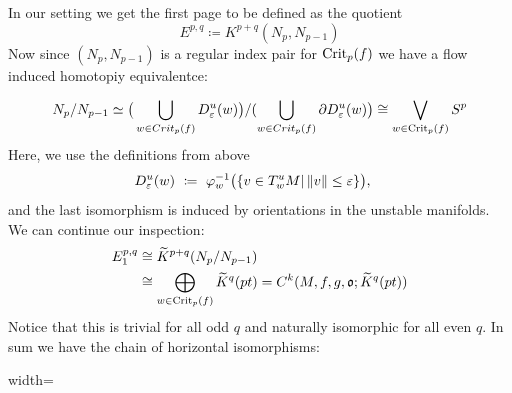 \begin{corollary}
	In our setting we get the first page to be defined as the quotient
	\begin{equation*}
		E^{p,q}  \coloneq K^{p+q}(N_p,N_{p-1})
	\end{equation*}
	Now since $(N_p,N_{p-1})$ is a regular index pair for $\mathrm{Crit}_p(f)$ we have a flow induced homotopiy equivalentce:
	
	\begin{equation*}
		N_p\slash N_{p-1}
		\simeq          \big(\bigcup_{w\in Crit_p(f)}D^u_\varepsilon(w)\big) \slash (\bigcup_{w\in Crit_p(f)} \partial D^u_\varepsilon(w)\big)
		\cong           \bigvee_{w\in \mathrm{Crit}_p(f)}S^p
	\end{equation*} Here, we use the definitions from above
	\begin{align*}
		D^{u}_\varepsilon (w)&~\coloneq~ \varphi_w^{-1} \big(\{v\in T_w^{u }M | \left\lVert v\right\rVert\leq \varepsilon \} \big),
	\end{align*}and the last isomorphism is induced by orientations in the unstable manifolds. We can continue our inspection:
	\begin{align}\label{def: The Map between E_1 and Morse chain group}
		E^{p,q}_1&\cong \widetilde{K}^{p+q}(N_p\slash N_{p-1})\\
		&\cong \bigoplus_{w\in \mathrm{Crit}_p(f)}\widetilde{K}^q(pt)=C^k(M,f,g,\mathfrak{o};\widetilde{K}^q(pt))\\
	\end{align} Notice that this is trivial for all odd $q$ and naturally isomorphic for all even $q$. In sum we have the chain of horizontal isomorphisms:
	\begin{fdiagram}\label{diag: first page comparison}
		\begin{adjustbox}{width=\textwidth}
		\end{adjustbox}
		
	\end{fdiagram}
\end{corollary}

